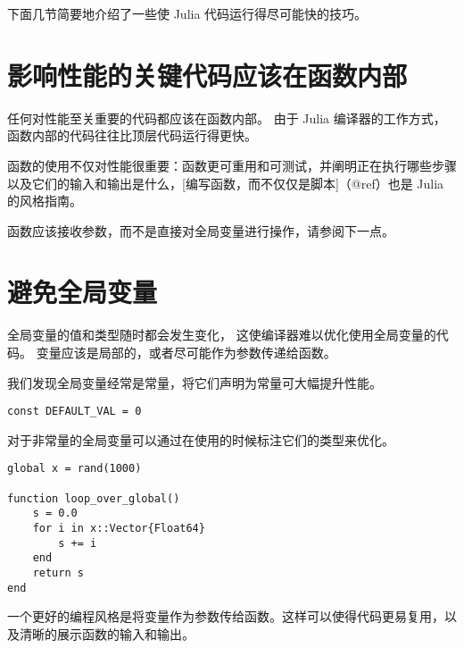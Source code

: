 下面几节简要地介绍了一些使 Julia 代码运行得尽可能快的技巧。



\hypertarget{13114631835196295196}{}


\section{影响性能的关键代码应该在函数内部}



任何对性能至关重要的代码都应该在函数内部。 由于 Julia 编译器的工作方式，函数内部的代码往往比顶层代码运行得更快。



函数的使用不仅对性能很重要：函数更可重用和可测试，并阐明正在执行哪些步骤以及它们的输入和输出是什么，[编写函数，而不仅仅是脚本]（@ref）也是 Julia 的风格指南。



函数应该接收参数，而不是直接对全局变量进行操作，请参阅下一点。



\hypertarget{14492220707033250800}{}


\section{避免全局变量}



全局变量的值和类型随时都会发生变化， 这使编译器难以优化使用全局变量的代码。 变量应该是局部的，或者尽可能作为参数传递给函数。



我们发现全局变量经常是常量，将它们声明为常量可大幅提升性能。




\begin{verbatim}
const DEFAULT_VAL = 0
\end{verbatim}



对于非常量的全局变量可以通过在使用的时候标注它们的类型来优化。




\begin{verbatim}
global x = rand(1000)

function loop_over_global()
    s = 0.0
    for i in x::Vector{Float64}
        s += i
    end
    return s
end
\end{verbatim}



一个更好的编程风格是将变量作为参数传给函数。这样可以使得代码更易复用，以及清晰的展示函数的输入和输出。



